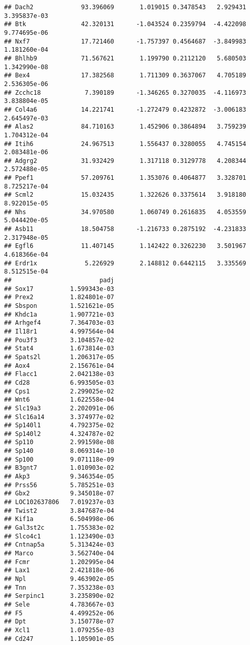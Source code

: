 \documentclass[
]{article}
\begin{document}
\begin{verbatim}
## Dach2             93.396069       1.019015 0.3478543   2.929431 3.395837e-03
## Btk               42.320131      -1.043524 0.2359794  -4.422098 9.774695e-06
## Nxf7              17.721460      -1.757397 0.4564687  -3.849983 1.181260e-04
## Bhlhb9            71.567621       1.199790 0.2112120   5.680503 1.342990e-08
## Bex4              17.382568       1.711309 0.3637067   4.705189 2.536305e-06
## Zcchc18            7.390189      -1.346265 0.3270035  -4.116973 3.838804e-05
## Col4a6            14.221741      -1.272479 0.4232872  -3.006183 2.645497e-03
## Alas2             84.710163       1.452906 0.3864894   3.759239 1.704312e-04
## Itih6             24.967513       1.556437 0.3280055   4.745154 2.083481e-06
## Adgrg2            31.932429       1.317118 0.3129778   4.208344 2.572488e-05
## Ppef1             57.209761       1.353076 0.4064877   3.328701 8.725217e-04
## Scml2             15.032435       1.322626 0.3375614   3.918180 8.922015e-05
## Nhs               34.970580       1.060749 0.2616835   4.053559 5.044420e-05
## Asb11             18.504758      -1.216733 0.2875192  -4.231833 2.317948e-05
## Egfl6             11.407145       1.142422 0.3262230   3.501967 4.618366e-04
## Erdr1x             5.226929       2.148812 0.6442115   3.335569 8.512515e-04
##                        padj
## Sox17          1.599343e-03
## Prex2          1.824801e-07
## Sbspon         1.521621e-05
## Khdc1a         1.907721e-03
## Arhgef4        7.364703e-03
## Il18r1         4.997564e-04
## Pou3f3         3.104857e-02
## Stat4          1.673814e-03
## Spats2l        1.206317e-05
## Aox4           2.156761e-04
## Flacc1         2.042138e-03
## Cd28           6.993505e-03
## Cps1           2.299025e-02
## Wnt6           1.622558e-04
## Slc19a3        2.202091e-06
## Slc16a14       3.374977e-02
## Sp140l1        4.792375e-02
## Sp140l2        4.324787e-02
## Sp110          2.991598e-08
## Sp140          8.069314e-10
## Sp100          9.071118e-09
## B3gnt7         1.010903e-02
## Akp3           9.346354e-05
## Prss56         5.785251e-03
## Gbx2           9.345018e-07
## LOC102637806   7.019237e-03
## Twist2         3.847687e-04
## Kif1a          6.504998e-06
## Gal3st2c       1.755383e-02
## Slco4c1        1.123490e-03
## Cntnap5a       5.313424e-03
## Marco          3.562740e-04
## Fcmr           1.202995e-04
## Lax1           2.421818e-06
## Npl            9.463902e-05
## Tnn            7.353238e-03
## Serpinc1       3.235890e-02
## Sele           4.783667e-03
## F5             4.499252e-06
## Dpt            3.150778e-07
## Xcl1           1.079255e-03
## Cd247          1.105901e-05

\end{verbatim}
\end{document}
